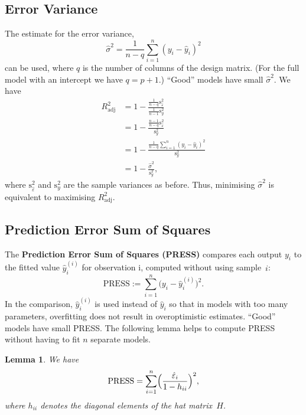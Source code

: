 \documentclass[
  a4paper,
]{article}
\newtheorem{lemma}{Lemma}[section]
\theoremstyle{definition}
\theoremstyle{definition}
\theoremstyle{definition}
\theoremstyle{definition}
\theoremstyle{remark}
\begin{document}
\subsection{Error Variance}\label{error-var}

The estimate for the error variance,
\begin{equation*}
  \hat\sigma^2 = \frac{1}{n - q} \sum_{i=1}^n (y_i - \hat y_i)^2
\end{equation*}
can be used, where \(q\) is the number of columns of the design matrix.
(For the full model with an intercept we have \(q = p+1\).)
``Good'' models have small \(\hat\sigma^2\). We have
\begin{align*}
  R^2_\mathrm{adj}
  &= 1 - \frac{\frac{1}{n-q}\mathrm{s}_{\hat\varepsilon}^2}{\frac{1}{n-1}\mathrm{s}_y^2} \\
  &= 1 - \frac{\frac{n-1}{n-q}\mathrm{s}_{\hat\varepsilon}^2}{\mathrm{s}_y^2} \\
  &= 1 - \frac{\frac{1}{n-q} \sum_{i=1}^n (y_i - \hat y_i)^2}{\mathrm{s}_y^2} \\
  &= 1 - \frac{\hat\sigma^2}{\mathrm{s}_y^2},
\end{align*}
where \(\mathrm{s}_{\hat\varepsilon}^2\) and \(\mathrm{s}_y^2\) are the sample variances
as before. Thus, minimising \(\hat\sigma^2\) is equivalent to
maximising \(R^2_\mathrm{adj}\).

\subsection{Prediction Error Sum of Squares}\label{PRESS}

The \textbf{Prediction Error Sum of Squares (PRESS)} compares each
output \(y_i\) to the fitted value \(\hat y^{(i)}_i\) for observation i,
computed without using sample~\(i\):
\begin{equation*}
   \mathrm{PRESS}
   := \sum_{i=1}^n \bigl( y_i - \hat y^{(i)}_i \bigr)^2.
\end{equation*}
In the comparison, \(\hat y^{(i)}_i\) is used instead of \(\hat y_i\)
so that in models with too many parameters, overfitting does not
result in overoptimistic estimates.
``Good'' models have small PRESS. The following lemma helps to compute
PRESS without having to fit \(n\) separate models.

\begin{lemma}
\protect\hypertarget{lem:PRESS}{}\label{lem:PRESS}We have
\begin{equation*}
   \mathrm{PRESS}
   = \sum_{i=1}^n \Bigl( \frac{\hat\varepsilon_i}{1 - h_{ii}} \Bigr)^2,
\end{equation*}
where \(h_{ii}\) denotes the diagonal elements of the hat matrix~\(H\).
\end{lemma}
\end{document}
